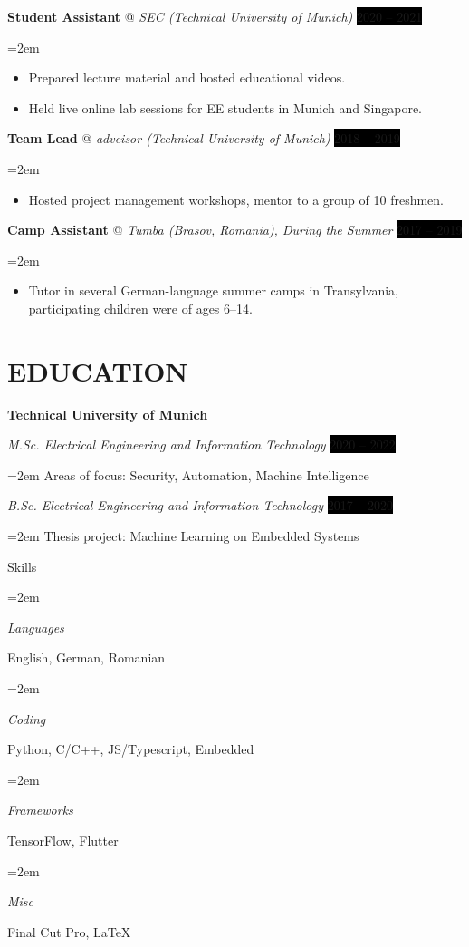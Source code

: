 \documentclass[paper=a4,fontsize=11pt]{scrartcl}
\makeatletter
\newlength{\spacebox}
\newcommand{\sepspace}{\vspace*{0.45em}}		%
\newcommand{\NewPart}[1]{\section*{\uppercase{#1}}}
\newcommand{\PersonalEntry}[2]{
		\noindent\hangindent=2em\hangafter=0 %
		\parbox{\spacebox}{        %
		\textit{#1}}		       %
		\hspace{1.5em} #2 \par}    %
\newcommand{\SkillsEntry}[2]{      %
		\noindent\hangindent=2em\hangafter=0 %
		\parbox{\spacebox}{        %
		\textit{#1}}			   %
		\hspace{2.5em} #2 \par}    %
\newcommand{\EducationEntry}[4]{
		\noindent \textit{#1} \hfill      %
		\colorbox{black}{\color{white}#2} \par  %
		\noindent\hangindent=2em\hangafter=0 \small #3 %
		\normalsize \par}
\newcommand{\WorkEntry}[4]{				  %
		\noindent \textbf{#1} @ \textit{#3} \hfill      %
		\colorbox{black}{\color{white}#2} \par  %
		\noindent\hangindent=2em\hangafter=0 \small #4 %
		\normalsize \par}
\makeatother
\begin{document}
\WorkEntry{Student Assistant}{2020 – 2021}{SEC (Technical University of Munich)}
{
\begin{itemize}
  \item Prepared lecture material and hosted educational videos.
  \item Held live online lab sessions for EE students in Munich and Singapore.
\end{itemize}
}
\sepspace

\WorkEntry{Team Lead}{2018 – 2019}{adveisor (Technical University of Munich)}
{
\begin{itemize}
  \item Hosted project management workshops, mentor to a group of 10 freshmen.
\end{itemize}
}
\sepspace

\WorkEntry{Camp Assistant}{2017 – 2019}{Tumba (Brasov, Romania), During the Summer}
{
\begin{itemize}
  \item Tutor in several German-language summer camps in Transylvania, participating children were of ages 6–14.
\end{itemize}
}

\NewPart{Education}{}
\textbf{Technical University of Munich}

\EducationEntry{M.Sc. Electrical Engineering and Information Technology}{2020 – 2022}{Areas of focus: Security, Automation, Machine Intelligence}
\sepspace

\EducationEntry{B.Sc. Electrical Engineering and Information Technology}{2017 – 2020} {Thesis project: Machine Learning on Embedded Systems}


\NewPart{Skills}{}

\SkillsEntry{Languages}{English, German, Romanian}
\SkillsEntry{Coding}{Python, \textsc{C/C++}, JS/Typescript, Embedded}
\SkillsEntry{Frameworks}{TensorFlow, Flutter}
\SkillsEntry{Misc}{Final Cut Pro, \LaTeX}


\end{document}
